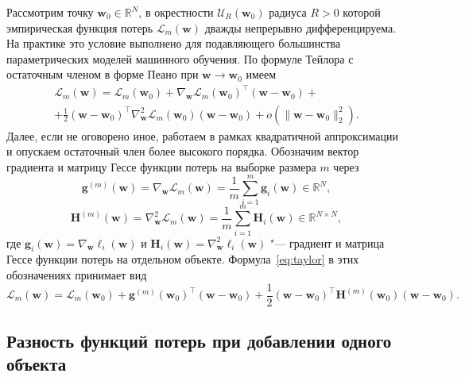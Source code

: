Рассмотрим точку $\mathbf{w}_0 \in \mathbb{R}^{N}$, в окрестности $\mathcal{U}_{R}(\mathbf{w}_0)$ радиуса $R>0$ которой эмпирическая функция потерь $\mathcal{L}_{m}(\mathbf{w})$ дважды непрерывно дифференцируема. На практике это условие выполнено для подавляющего большинства параметрических моделей машинного обучения. По формуле Тейлора с остаточным членом в форме Пеано при $\mathbf{w} \to \mathbf{w}_0$ имеем
\begin{multline}
    \label{eq:taylor}
    \mathcal{L}_{m}(\mathbf{w}) = \mathcal{L}_{m}(\mathbf{w}_0)
    +
    \nabla_{\mathbf{w}} \mathcal{L}_{m}(\mathbf{w}_0)^{\top} (\mathbf{w} - \mathbf{w}_0)
    +
    \\
    +
    \frac{1}{2} (\mathbf{w} - \mathbf{w}_0)^{\top} \nabla^{2}_{\mathbf{w}} \mathcal{L}_{m}(\mathbf{w}_0) (\mathbf{w} - \mathbf{w}_0)
    +
    o(\| \mathbf{w} - \mathbf{w}_0 \|_2^2).
\end{multline}
Далее, если не оговорено иное, работаем в рамках квадратичной аппроксимации и опускаем остаточный член более высокого порядка. Обозначим вектор градиента и матрицу Гессе функции потерь на выборке размера $m$ через
\begin{equation}
    \label{eq:taylor-gradient}
    \mathbf{g}^{(m)}(\mathbf{w}) = \nabla_{\mathbf{w}} \mathcal{L}_{m}(\mathbf{w}) = \frac{1}{m}\sum_{i=1}^m \mathbf{g}_i(\mathbf{w}) \in \mathbb{R}^{N},
\end{equation}
\begin{equation}
    \label{eq:taylor-hessian}
    \mathbf{H}^{(m)}(\mathbf{w}) = \nabla^{2}_{\mathbf{w}} \mathcal{L}_{m}(\mathbf{w}) = \frac{1}{m}\sum_{i=1}^m \mathbf{H}_i(\mathbf{w}) \in \mathbb{R}^{N \times N},
\end{equation}
где $\mathbf{g}_i(\mathbf{w}) = \nabla_{\mathbf{w}} \ell_i(\mathbf{w})$ и $\mathbf{H}_i(\mathbf{w}) = \nabla^{2}_{\mathbf{w}} \ell_i(\mathbf{w})$ "--- градиент и матрица Гессе функции потерь на отдельном объекте. Формула~\eqref{eq:taylor} в этих обозначениях принимает вид
\begin{equation}
    \label{eq:taylor-second-order}
    \mathcal{L}_{m}(\mathbf{w}) = \mathcal{L}_{m}(\mathbf{w}_0)
    +
    \mathbf{g}^{(m)}(\mathbf{w}_0)^{\top} (\mathbf{w} - \mathbf{w}_0)
    +
    \frac{1}{2} (\mathbf{w} - \mathbf{w}_0)^{\top} \mathbf{H}^{(m)}(\mathbf{w}_0) (\mathbf{w} - \mathbf{w}_0).
\end{equation}

\subsection{Разность функций потерь при добавлении одного объекта}\label{subsec:loss-diff}

